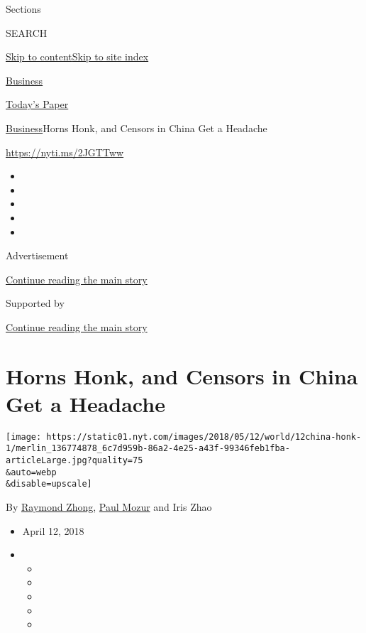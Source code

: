Sections

SEARCH

\protect\hyperlink{site-content}{Skip to
content}\protect\hyperlink{site-index}{Skip to site index}

\href{https://www.nytimes.com/section/business}{Business}

\href{https://myaccount.nytimes.com/auth/login?response_type=cookie\&client_id=vi}{}

\href{https://www.nytimes.com/section/todayspaper}{Today's Paper}

\href{/section/business}{Business}\textbar{}Horns Honk, and Censors in
China Get a Headache

\url{https://nyti.ms/2JGTTww}

\begin{itemize}
\item
\item
\item
\item
\item
\end{itemize}

Advertisement

\protect\hyperlink{after-top}{Continue reading the main story}

Supported by

\protect\hyperlink{after-sponsor}{Continue reading the main story}

\hypertarget{horns-honk-and-censors-in-china-get-a-headache}{%
\section{Horns Honk, and Censors in China Get a
Headache}\label{horns-honk-and-censors-in-china-get-a-headache}}

\texttt{[image: https://static01.nyt.com/images/2018/05/12/world/12china-honk-1/merlin\_136774878\_6c7d959b-86a2-4e25-a43f-99346feb1fba-articleLarge.jpg?quality=75\\\&auto=webp\\\&disable=upscale]}

By \href{https://www.nytimes.com/by/raymond-zhong}{Raymond Zhong},
\href{https://www.nytimes.com/by/paul-mozur}{Paul Mozur} and Iris Zhao

\begin{itemize}
\item
  April 12, 2018
\item
  \begin{itemize}
  \item
  \item
  \item
  \item
  \item
  \end{itemize}
\end{itemize}

